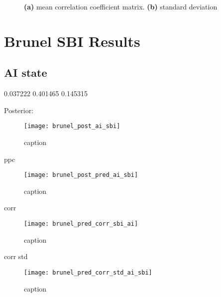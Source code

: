 \begin{figure}[H]
\centering
{}
\qquad
{}
\caption{\textbf{(a)} mean correlation coefficient matrix. \textbf{(b)} standard deviation
}
\label{fig:fig1}
\end{figure}





\section{Brunel SBI Results}

\subsection{AI state} 



0.037222	0.401465	0.145315

Posterior:

\begin{figure}[H]
    \centering
    \texttt{[image: brunel\_post\_ai\_sbi]}
    \caption{caption}
    \label{fig:fig1}
\end{figure}

ppc 

\begin{figure}[H]
    \centering
    \texttt{[image: brunel\_post\_pred\_ai\_sbi]}
    \caption{caption}
    \label{fig:fig1}
\end{figure}

corr 

\begin{figure}[H]
    \centering
    \texttt{[image: brunel\_pred\_corr\_sbi\_ai]}
    \caption{caption}
    \label{fig:fig1}
\end{figure}

corr std

\begin{figure}[H]
    \centering
    \texttt{[image: brunel\_pred\_corr\_std\_ai\_sbi]}
    \caption{caption}
    \label{fig:fig1}
\end{figure}

